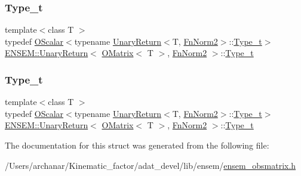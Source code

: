 \subsubsection{\texorpdfstring{Type\_t}{Type\_t}\hspace{0.1cm}{\footnotesize\ttfamily [1/2]}}
{\footnotesize\ttfamily template$<$class T $>$ \\
typedef \mbox{\hyperlink{classENSEM_1_1OScalar}{O\+Scalar}}$<$typename \mbox{\hyperlink{structENSEM_1_1UnaryReturn}{Unary\+Return}}$<$T, \mbox{\hyperlink{structENSEM_1_1FnNorm2}{Fn\+Norm2}}$>$\+::\mbox{\hyperlink{structENSEM_1_1UnaryReturn_3_01OMatrix_3_01T_01_4_00_01FnNorm2_01_4_a4ec82ac7d8a71ef886cafde5b7ecff03}{Type\+\_\+t}}$>$ \mbox{\hyperlink{structENSEM_1_1UnaryReturn}{E\+N\+S\+E\+M\+::\+Unary\+Return}}$<$ \mbox{\hyperlink{classENSEM_1_1OMatrix}{O\+Matrix}}$<$ T $>$, \mbox{\hyperlink{structENSEM_1_1FnNorm2}{Fn\+Norm2}} $>$\+::\mbox{\hyperlink{structENSEM_1_1UnaryReturn_3_01OMatrix_3_01T_01_4_00_01FnNorm2_01_4_a4ec82ac7d8a71ef886cafde5b7ecff03}{Type\+\_\+t}}}

\mbox{\label{structENSEM_1_1UnaryReturn_3_01OMatrix_3_01T_01_4_00_01FnNorm2_01_4_a4ec82ac7d8a71ef886cafde5b7ecff03}} 
\subsubsection{\texorpdfstring{Type\_t}{Type\_t}\hspace{0.1cm}{\footnotesize\ttfamily [2/2]}}
{\footnotesize\ttfamily template$<$class T $>$ \\
typedef \mbox{\hyperlink{classENSEM_1_1OScalar}{O\+Scalar}}$<$typename \mbox{\hyperlink{structENSEM_1_1UnaryReturn}{Unary\+Return}}$<$T, \mbox{\hyperlink{structENSEM_1_1FnNorm2}{Fn\+Norm2}}$>$\+::\mbox{\hyperlink{structENSEM_1_1UnaryReturn_3_01OMatrix_3_01T_01_4_00_01FnNorm2_01_4_a4ec82ac7d8a71ef886cafde5b7ecff03}{Type\+\_\+t}}$>$ \mbox{\hyperlink{structENSEM_1_1UnaryReturn}{E\+N\+S\+E\+M\+::\+Unary\+Return}}$<$ \mbox{\hyperlink{classENSEM_1_1OMatrix}{O\+Matrix}}$<$ T $>$, \mbox{\hyperlink{structENSEM_1_1FnNorm2}{Fn\+Norm2}} $>$\+::\mbox{\hyperlink{structENSEM_1_1UnaryReturn_3_01OMatrix_3_01T_01_4_00_01FnNorm2_01_4_a4ec82ac7d8a71ef886cafde5b7ecff03}{Type\+\_\+t}}}



The documentation for this struct was generated from the following file\+:\begin{DoxyCompactItemize}
\item 
/\+Users/archanar/\+Kinematic\+\_\+factor/adat\+\_\+devel/lib/ensem/\mbox{\hyperlink{lib_2ensem_2ensem__obsmatrix_8h}{ensem\+\_\+obsmatrix.\+h}}\end{DoxyCompactItemize}
